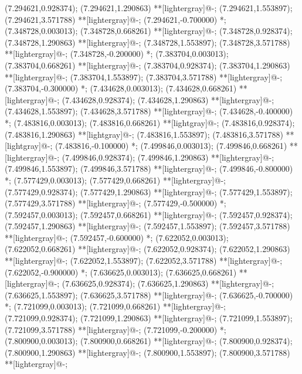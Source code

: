 (7.294621,0.928374); (7.294621,1.290863) **[lightergray]@{-};
(7.294621,1.553897); (7.294621,3.571788) **[lightergray]@{-};
(7.294621,-0.700000) *{};
(7.348728,0.003013); (7.348728,0.668261) **[lightergray]@{-};
(7.348728,0.928374); (7.348728,1.290863) **[lightergray]@{-};
(7.348728,1.553897); (7.348728,3.571788) **[lightergray]@{-};
(7.348728,-0.200000) *{};
(7.383704,0.003013); (7.383704,0.668261) **[lightergray]@{-};
(7.383704,0.928374); (7.383704,1.290863) **[lightergray]@{-};
(7.383704,1.553897); (7.383704,3.571788) **[lightergray]@{-};
(7.383704,-0.300000) *{};
(7.434628,0.003013); (7.434628,0.668261) **[lightergray]@{-};
(7.434628,0.928374); (7.434628,1.290863) **[lightergray]@{-};
(7.434628,1.553897); (7.434628,3.571788) **[lightergray]@{-};
(7.434628,-0.400000) *{};
(7.483816,0.003013); (7.483816,0.668261) **[lightgray]@{-};
(7.483816,0.928374); (7.483816,1.290863) **[lightgray]@{-};
(7.483816,1.553897); (7.483816,3.571788) **[lightgray]@{-};
(7.483816,-0.100000) *{};
(7.499846,0.003013); (7.499846,0.668261) **[lightergray]@{-};
(7.499846,0.928374); (7.499846,1.290863) **[lightergray]@{-};
(7.499846,1.553897); (7.499846,3.571788) **[lightergray]@{-};
(7.499846,-0.800000) *{};
(7.577429,0.003013); (7.577429,0.668261) **[lightergray]@{-};
(7.577429,0.928374); (7.577429,1.290863) **[lightergray]@{-};
(7.577429,1.553897); (7.577429,3.571788) **[lightergray]@{-};
(7.577429,-0.500000) *{};
(7.592457,0.003013); (7.592457,0.668261) **[lightergray]@{-};
(7.592457,0.928374); (7.592457,1.290863) **[lightergray]@{-};
(7.592457,1.553897); (7.592457,3.571788) **[lightergray]@{-};
(7.592457,-0.600000) *{};
(7.622052,0.003013); (7.622052,0.668261) **[lightergray]@{-};
(7.622052,0.928374); (7.622052,1.290863) **[lightergray]@{-};
(7.622052,1.553897); (7.622052,3.571788) **[lightergray]@{-};
(7.622052,-0.900000) *{};
(7.636625,0.003013); (7.636625,0.668261) **[lightergray]@{-};
(7.636625,0.928374); (7.636625,1.290863) **[lightergray]@{-};
(7.636625,1.553897); (7.636625,3.571788) **[lightergray]@{-};
(7.636625,-0.700000) *{};
(7.721099,0.003013); (7.721099,0.668261) **[lightergray]@{-};
(7.721099,0.928374); (7.721099,1.290863) **[lightergray]@{-};
(7.721099,1.553897); (7.721099,3.571788) **[lightergray]@{-};
(7.721099,-0.200000) *{};
(7.800900,0.003013); (7.800900,0.668261) **[lightergray]@{-};
(7.800900,0.928374); (7.800900,1.290863) **[lightergray]@{-};
(7.800900,1.553897); (7.800900,3.571788) **[lightergray]@{-};
